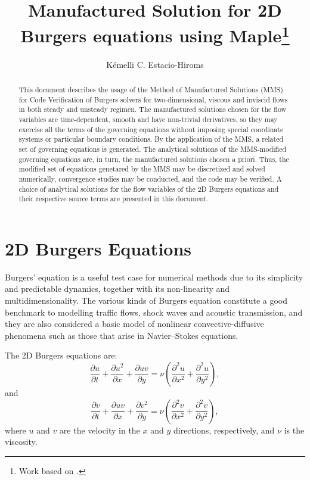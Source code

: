 \documentclass[10pt]{article}
\title{Manufactured Solution for 2D Burgers equations using Maple\footnote{Work based on \citet*{Salari_Knupp_2000}.}}
\author{Kémelli C. Estacio-Hiroms}
\newcommand{\diff}[2] {\dfrac{\partial #1}{\partial #2}}
\begin{document}
\maketitle

\begin{abstract}
This document describes the usage of the Method of Manufactured Solutions (MMS) for Code Verification of Burgers solvers for two-dimensional, viscous and inviscid flows in both steady and unsteady regimen. The manufactured solutions chosen for the flow variables are time-dependent, smooth and have non-trivial derivatives, so they may exercise all the terms of the governing equations without imposing special coordinate systems or particular
boundary conditions. By the application of the MMS, a related set of governing equations is generated. The analytical solutions of the MMS-modified governing equations are, in turn, the manufactured solutions chosen a priori. %
Thus, the modified set of equations genetared by the MMS may be discretized and solved numerically, convergence studies may be conducted, and the code may be verified.
A choice of analytical solutions for the flow variables of the 2D Burgers equations and their respective source terms are presented in this document.
\end{abstract}


\section{2D Burgers Equations}

Burgers' equation is a useful test case for numerical methods due to its simplicity and predictable dynamics, together with its non-linearity and multidimensionality. The various kinds of Burgers equation constitute a good benchmark to modelling traffic flows, shock waves and acoustic transmission, and they are also considered a basic model of nonlinear convective-diffusive phenomena such as those that arise
in Navier–Stokes equations.


The 2D Burgers  equations are:
\begin{equation}
 \label{eq:burgers2d_01}
\diff{ u}{t} + \diff{ u^2 }{x}+\diff{uv}{y}=\nu \left( \diff{^2u}{ x^2}+ \diff{^2u }{y^2}\right),
\end{equation}
and
\begin{equation}
 \label{eq:burgers2d_02}
 \diff{ v}{t}+ \diff{ u v}{x} + \diff{  v^2 }{y}=\nu \left( \diff{^2v}{ x^2}+ \diff{^2v }{y^2}\right),
\end{equation}
%
where $u$ and $v$ are the velocity in the  $x$ and $y$  directions, respectively, and $\nu$ is the viscosity.
\end{document}

